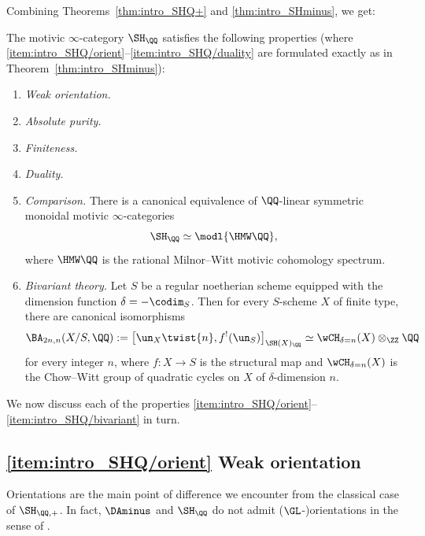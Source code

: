 Combining Theorems~\ref{thm:intro_SHQ+} and \ref{thm:intro_SHminus}, we get:

\begin{cori}\label{cor:intro_SHQ}
The motivic $\infty$-category $\SH_{\QQ}$ satisfies the following properties (where \eqref{item:intro_SHQ/orient}--\eqref{item:intro_SHQ/duality} are formulated exactly as in Theorem~\ref{thm:intro_SHminus}):

\begin{enumerate}\renewcommand{\theenumi}{\Roman{enumi}}
\item\emph{Weak orientation.}\label{item:intro_SHQ/orient}
\item\emph{Absolute purity.}\label{item:intro_SHQ/purity}
\item\emph{Finiteness.}\label{item:intro_SHQ/finiteness}
\item\emph{Duality.}\label{item:intro_SHQ/duality}
\item\emph{Comparison.}\label{item:intro_SHQ/comparison}
There is a canonical equivalence of $\QQ$-linear symmetric monoidal motivic $\infty$-categories
\[
\SH_{\QQ} \simeq \modl{\HMW\QQ},
\]
where $\HMW\QQ$ is the rational Milnor--Witt motivic cohomology spectrum.
\item\emph{Bivariant theory.}\label{item:intro_SHQ/bivariant}
Let $S$ be a regular noetherian scheme equipped with the dimension function $\delta=-\codim_S$.
Then for every $S$-scheme $X$ of finite type, there are canonical isomorphisms
\[
\BA_{2n,n}(X/S, \QQ)
:= \big[ \un_X\twist{n}, f^!(\un_S) \big]_{\SH(X)_\QQ}
\simeq \wCH_{\delta=n}(X) \otimes_\ZZ \QQ
\]
for every integer $n$, where $f : X \to S$ is the structural map and $\wCH_{\delta=n}(X)$ is the Chow--Witt group of quadratic cycles on $X$ of $\delta$-dimension $n$.
\end{enumerate}
\end{cori}

We now discuss each of the properties \eqref{item:intro_SHQ/orient}--\eqref{item:intro_SHQ/bivariant} in turn.

\subsection*{\eqref{item:intro_SHQ/orient} Weak orientation}

Orientations are the main point of difference we encounter from the classical case of $\SH_{\QQ,+}$.
In fact, $\DAminus$ and $\SH_\QQ$ do not admit ($\GL$-)orientations in the sense of \cite[Def.\,2.4.38]{CD3}.

